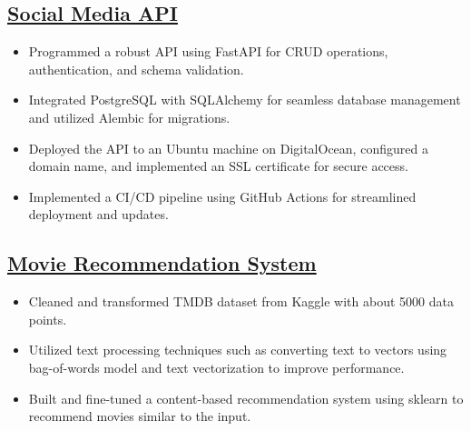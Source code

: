 \documentclass[a4paper,11pt]{article}
\begin{document}
\subsection*{\href{https://github.com/kanakOS01/social-media-fastapi}{Social Media API}}
\begin{itemize}[itemsep=0pt,parsep=0pt,topsep=0pt,partopsep=0pt]
    \item Programmed a robust API using FastAPI for CRUD operations, authentication, and schema validation.
    \item Integrated PostgreSQL with SQLAlchemy for seamless database management and utilized Alembic for migrations.
    \item Deployed the API to an Ubuntu machine on DigitalOcean, configured a domain name, and implemented an SSL certificate for secure access.
    \item Implemented a CI/CD pipeline using GitHub Actions for streamlined deployment and updates.
\end{itemize}
\vspace{-3mm}

\subsection*{\href{https://github.com/kanakOS01/movie-recommender-system}{Movie Recommendation System}}
\begin{itemize}[itemsep=0pt,parsep=0pt,topsep=0pt,partopsep=0pt]
    \item Cleaned and transformed TMDB dataset from Kaggle with about 5000 data points.
    \item Utilized text processing techniques such as converting text to vectors using bag-of-words model and text vectorization to improve performance. 
    \item Built and fine-tuned a content-based recommendation system using sklearn to recommend movies similar to the input.
\end{itemize}
\vspace{-3mm}

\end{document}

